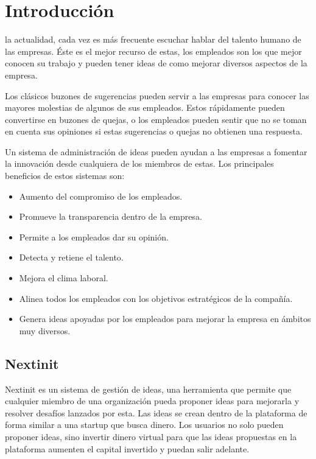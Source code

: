 \chapter{Introducción}

 la actualidad, cada vez es más frecuente escuchar hablar del talento humano de las empresas. Éste es el mejor recurso de estas,
 los empleados son los que mejor conocen su trabajo y pueden tener ideas de como mejorar diversos aspectos de la empresa. 
 
 Los clásicos buzones de sugerencias pueden servir a las empresas para conocer las mayores molestias de algunos de sus empleados. Estos 
 rápidamente pueden convertirse en buzones de quejas, o los empleados pueden sentir que no se toman en cuenta sus opiniones si estas 
 sugerencias o quejas no obtienen una respuesta.
 
 Un sistema de administración de ideas pueden ayudan a las empresas a fomentar la innovación desde cualquiera de los miembros de estas. Los 
 principales beneficios de estos sistemas son:
 
 \begin{itemize}
 	\item Aumento del compromiso de los empleados.
 	\item Promueve la transparencia dentro de la empresa.
 	\item Permite a los empleados dar su opinión.
 	\item Detecta y retiene el talento.
 	\item Mejora el clima laboral.
 	\item Alinea todos los empleados con los objetivos estratégicos de la compañía.
 	\item Genera ideas apoyadas por los empleados para mejorar la empresa en ámbitos muy diversos.
 \end{itemize}
 
 
 \section{Nextinit}
 
 Nextinit es un sistema de gestión de ideas, una herramienta que permite que cualquier miembro de una organización pueda proponer ideas para
 mejorarla y resolver desafíos lanzados por esta. Las ideas se crean dentro de la plataforma de forma similar a una startup que busca dinero. Los 
 usuarios no solo pueden  proponer ideas, sino invertir dinero virtual para que las ideas propuestas en la plataforma aumenten el capital invertido 
 y puedan salir adelante.
 
